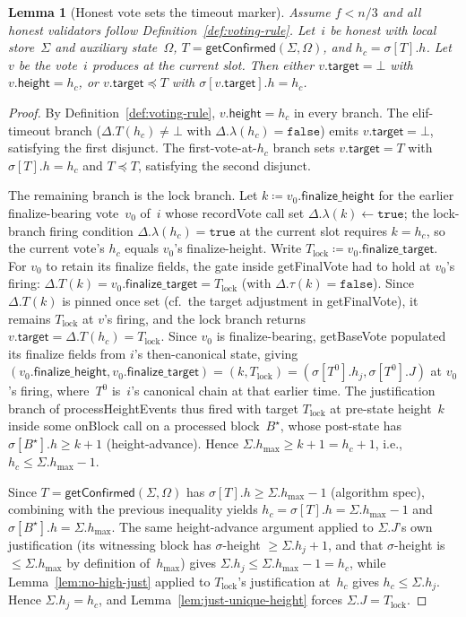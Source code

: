 \documentclass{article}
\newcommand{\target}{\mathsf{target}}
\newcommand{\height}{\mathsf{height}}
\newcommand{\finalizeHeight}{\mathsf{finalize\_height}}
\newcommand{\finalizeTarget}{\mathsf{finalize\_target}}
\newcommand{\hmax}{\ensuremath{h_{\max}}\xspace}
\newcommand{\processHeightEvents}{\textsf{processHeightEvents}\xspace}
\newcommand{\getBaseVote}{\textsf{getBaseVote}\xspace}
\newcommand{\getFinalVote}{\textsf{getFinalVote}\xspace}
\newcommand{\recordVote}{\textsf{recordVote}\xspace}
\newcommand{\onBlock}{\textsf{onBlock}\xspace}
\newcommand{\getConfirmed}{\textsf{getConfirmed}\xspace}
\theoremstyle{plain}
\newtheorem{lemma}{Lemma}
\theoremstyle{definition}
\theoremstyle{remark}
\begin{document}
\begin{lemma}[Honest vote sets the timeout marker]\label{lem:honest-vote-sets-timeout}
Assume $f < n/3$ and all honest validators follow Definition~\ref{def:voting-rule}.
Let~$i$ be honest with local store~$\Sigma$ and auxiliary state~$\Omega$, $T = \getConfirmed(\Sigma, \Omega)$, and $h_c = \sigma[T].h$.
Let~$v$ be the vote~$i$ produces at the current slot.
Then either $v.\target = \bot$ with $v.\height = h_c$, or $v.\target \preceq T$ with $\sigma[v.\target].h = h_c$.
\end{lemma}

\begin{proof}
By Definition~\ref{def:voting-rule}, $v.\height = h_c$ in every branch.
The elif-timeout branch ($\Delta.T(h_c) \neq \bot$ with $\Delta.\lambda(h_c) = \mathtt{false}$) emits $v.\target = \bot$, satisfying the first disjunct.
The first-vote-at-$h_c$ branch sets $v.\target = T$ with $\sigma[T].h = h_c$ and $T \preceq T$, satisfying the second disjunct.

The remaining branch is the lock branch.
Let $k \coloneqq v_0.\finalizeHeight$ for the earlier finalize-bearing vote~$v_0$ of~$i$ whose \recordVote call set $\Delta.\lambda(k) \gets \mathtt{true}$; the lock-branch firing condition $\Delta.\lambda(h_c) = \mathtt{true}$ at the current slot requires $k = h_c$, so the current vote's $h_c$ equals $v_0$'s finalize-height.
Write $T_{\mathrm{lock}} \coloneqq v_0.\finalizeTarget$.
For $v_0$ to retain its finalize fields, the gate inside \getFinalVote had to hold at $v_0$'s firing: $\Delta.T(k) = v_0.\finalizeTarget = T_{\mathrm{lock}}$ (with $\Delta.\tau(k) = \mathtt{false}$).
Since $\Delta.T(k)$ is pinned once set (cf.\ the target adjustment in \getFinalVote), it remains $T_{\mathrm{lock}}$ at $v$'s firing, and the lock branch returns $v.\target = \Delta.T(h_c) = T_{\mathrm{lock}}$.
Since $v_0$ is finalize-bearing, \getBaseVote populated its finalize fields from $i$'s then-canonical state, giving $(v_0.\finalizeHeight, v_0.\finalizeTarget) = (k, T_{\mathrm{lock}}) = (\sigma[T^0].h_j, \sigma[T^0].J)$ at $v_0$'s firing, where~$T^0$ is~$i$'s canonical chain at that earlier time.
The justification branch of \processHeightEvents thus fired with target $T_{\mathrm{lock}}$ at pre-state height~$k$ inside some \onBlock call on a processed block~$B^\star$, whose post-state has $\sigma[B^\star].h \geq k + 1$ (height-advance).
Hence $\Sigma.\hmax \geq k + 1 = h_c + 1$, i.e., $h_c \leq \Sigma.\hmax - 1$.

Since $T = \getConfirmed(\Sigma, \Omega)$ has $\sigma[T].h \geq \Sigma.\hmax - 1$ (algorithm spec), combining with the previous inequality yields $h_c = \sigma[T].h = \Sigma.\hmax - 1$ and $\sigma[B^\star].h = \Sigma.\hmax$.
The same height-advance argument applied to $\Sigma.J$'s own justification (its witnessing block has $\sigma$-height $\geq \Sigma.h_j + 1$, and that $\sigma$-height is $\leq \Sigma.\hmax$ by definition of~$\hmax$) gives $\Sigma.h_j \leq \Sigma.\hmax - 1 = h_c$, while Lemma~\ref{lem:no-high-just} applied to $T_{\mathrm{lock}}$'s justification at~$h_c$ gives $h_c \leq \Sigma.h_j$.
Hence $\Sigma.h_j = h_c$, and Lemma~\ref{lem:just-unique-height} forces $\Sigma.J = T_{\mathrm{lock}}$.


\end{proof}
\end{document}
